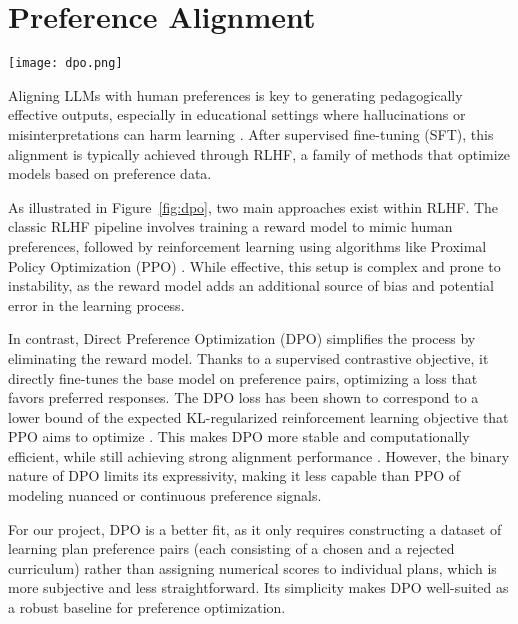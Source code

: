 \newpage
\section{Preference Alignment} 

\begin{figure*}[h!]
	\center
	\texttt{[image: dpo.png]}
	\caption{Comparison between different preference alignment methods. Figure sourced from \cite{lin2024limitedgeneralizationcapabilityimplicit}.}
	\label{fig:dpo}
\end{figure*}

Aligning LLMs with human preferences is key to generating pedagogically effective outputs, especially in educational settings where hallucinations or misinterpretations can harm learning \cite{wang2023aligning}. After supervised fine-tuning (SFT), this alignment is typically achieved through RLHF, a family of methods that optimize models based on preference data.

As illustrated in Figure~\ref{fig:dpo}, two main approaches exist within RLHF. The classic RLHF pipeline involves training a reward model to mimic human preferences, followed by reinforcement learning using algorithms like Proximal Policy Optimization (PPO) \cite{schulman2017proximalpolicyoptimizationalgorithms}. While effective, this setup is complex and prone to instability, as the reward model adds an additional source of bias and potential error in the learning process.

In contrast, Direct Preference Optimization (DPO) \cite{Rafailov2023DirectPO} simplifies the process by eliminating the reward model. Thanks to a supervised contrastive objective, it directly fine-tunes the base model on preference pairs, optimizing a loss that favors preferred responses. The DPO loss has been shown to correspond to a lower bound of the expected KL-regularized reinforcement learning objective that PPO aims to optimize \cite{ivison2024unpackingdpoppodisentangling}. This makes DPO more stable and computationally efficient, while still achieving strong alignment performance \cite{casper2023open}. However, the binary nature of DPO limits its expressivity, making it less capable than PPO of modeling nuanced or continuous preference signals.

For our project, DPO is a better fit, as it only requires constructing a dataset of learning plan preference pairs (each consisting of a chosen and a rejected curriculum) rather than assigning numerical scores to individual plans, which is more subjective and less straightforward. Its simplicity makes DPO well-suited as a robust baseline for preference optimization.

